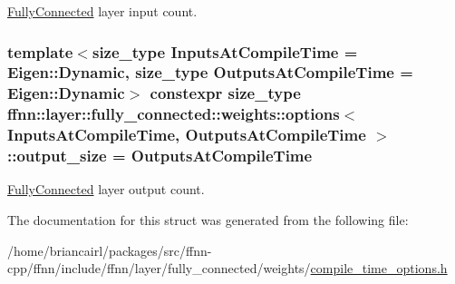\hyperlink{classffnn_1_1layer_1_1_fully_connected}{Fully\-Connected} layer input count. 

\hypertarget{structffnn_1_1layer_1_1fully__connected_1_1weights_1_1options_a45dac283a1611df3497baf255d8645c1}{
\subsubsection[{output\-\_\-size}]{\setlength{\rightskip}{0pt plus 5cm}template$<$size\-\_\-type Inputs\-At\-Compile\-Time = Eigen\-::\-Dynamic, size\-\_\-type Outputs\-At\-Compile\-Time = Eigen\-::\-Dynamic$>$ constexpr {\bf size\-\_\-type} {\bf ffnn\-::layer\-::fully\-\_\-connected\-::weights\-::options}$<$ Inputs\-At\-Compile\-Time, Outputs\-At\-Compile\-Time $>$\-::output\-\_\-size = Outputs\-At\-Compile\-Time\hspace{0.3cm}{\ttfamily [static]}}}\label{structffnn_1_1layer_1_1fully__connected_1_1weights_1_1options_a45dac283a1611df3497baf255d8645c1}


\hyperlink{classffnn_1_1layer_1_1_fully_connected}{Fully\-Connected} layer output count. 



The documentation for this struct was generated from the following file\-:\begin{DoxyCompactItemize}
\item 
/home/briancairl/packages/src/ffnn-\/cpp/ffnn/include/ffnn/layer/fully\-\_\-connected/weights/\hyperlink{fully__connected_2weights_2compile__time__options_8h}{compile\-\_\-time\-\_\-options.\-h}\end{DoxyCompactItemize}
